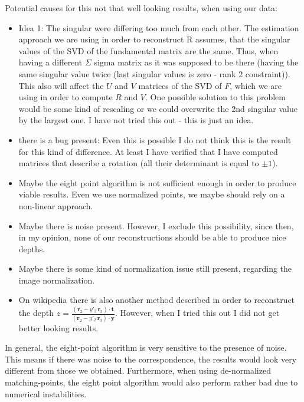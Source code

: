 \documentclass{paper}
\begin{document}
Potential causes for this not that well looking results, when using our data:
\begin{itemize}
    \item Idea 1: The singular were differing too much from each other. The estimation approach we are using in order to reconstruct R assumes, that the singular values of the SVD of the fundamental matrix are the same. Thus, when having a different $\Sigma$ sigma matrix as it was supposed to be there (having the same singular value twice (last singular values is zero - rank 2 constraint)). This also will affect the $U$ and $V$ matrices of the SVD of $F$, which we are using in order to compute $R$ and $V$. One possible solution to this problem would be some kind of rescaling or we could overwrite the 2nd singular value by the largest one. I have not tried this out - this is just an idea.
    \item there is a bug present: Even this is possible I do not think this is the result for this kind of difference. At least I have verified that I have computed matrices that describe a rotation (all their determinant is equal to $\pm 1$).
    \item Maybe the eight point algorithm is not sufficient enough in order to produce viable results. Even we use normalized points, we maybe should rely on a non-linear approach.
    \item Maybe there is noise present. However, I exclude this possibility, since then, in my opinion, none of our reconstructions should be able to produce nice depths.
    \item Maybe there is some kind of normalization issue still present, regarding the image normalization.
    \item On wikipedia there is also another method described in order to reconstruct the depth $z = \frac{ (\mathbf{r}_{2} - y'_{2} \, \mathbf{r}_{3}) \cdot \mathbf{t} }{ (\mathbf{r}_{2} - y'_{2} \, \mathbf{r}_{3}) \cdot \mathbf{y} } $. However, when I tried this out I did not get better looking results.
\end{itemize}

In general, the eight-point algorithm is very sensitive to the presence of noise. This means if there was noise to the correspondence, the results would look very different from those we obtained. Furthermore, when using de-normalized matching-points, the eight point algorithm would also perform rather bad due to numerical instabilities.
\end{document}
